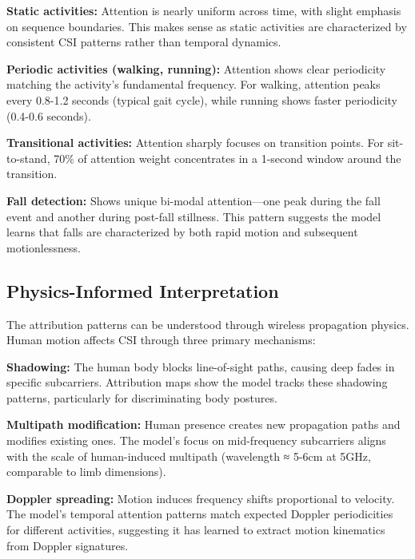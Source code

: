 \documentclass[journal]{IEEEtran}
\begin{document}
\textbf{Static activities:} Attention is nearly uniform across time, with slight emphasis on sequence boundaries. This makes sense as static activities are characterized by consistent CSI patterns rather than temporal dynamics.

\textbf{Periodic activities (walking, running):} Attention shows clear periodicity matching the activity's fundamental frequency. For walking, attention peaks every 0.8-1.2 seconds (typical gait cycle), while running shows faster periodicity (0.4-0.6 seconds).

\textbf{Transitional activities:} Attention sharply focuses on transition points. For sit-to-stand, 70\% of attention weight concentrates in a 1-second window around the transition.

\textbf{Fall detection:} Shows unique bi-modal attention—one peak during the fall event and another during post-fall stillness. This pattern suggests the model learns that falls are characterized by both rapid motion and subsequent motionlessness.

\subsection{Physics-Informed Interpretation}

The attribution patterns can be understood through wireless propagation physics. Human motion affects CSI through three primary mechanisms:

\textbf{Shadowing:} The human body blocks line-of-sight paths, causing deep fades in specific subcarriers. Attribution maps show the model tracks these shadowing patterns, particularly for discriminating body postures.

\textbf{Multipath modification:} Human presence creates new propagation paths and modifies existing ones. The model's focus on mid-frequency subcarriers aligns with the scale of human-induced multipath (wavelength ≈ 5-6cm at 5GHz, comparable to limb dimensions).

\textbf{Doppler spreading:} Motion induces frequency shifts proportional to velocity. The model's temporal attention patterns match expected Doppler periodicities for different activities, suggesting it has learned to extract motion kinematics from Doppler signatures.
\end{document}
